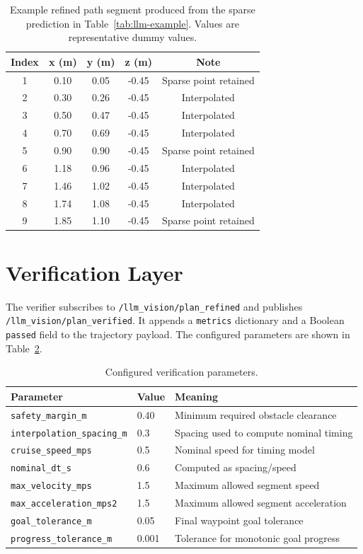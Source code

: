 \documentclass[11pt]{article}
\begin{document}
\begin{table}[H]
\centering
\caption{Example refined path segment produced from the sparse prediction in Table~\ref{tab:llm-example}. Values are representative dummy values.}
\label{tab:refined-example}
\begin{tabular}{ccccc}
\toprule
Index & x (m) & y (m) & z (m) & Note \\
\midrule
1 & 0.10 & 0.05 & -0.45 & Sparse point retained \\
2 & 0.30 & 0.26 & -0.45 & Interpolated \\
3 & 0.50 & 0.47 & -0.45 & Interpolated \\
4 & 0.70 & 0.69 & -0.45 & Interpolated \\
5 & 0.90 & 0.90 & -0.45 & Sparse point retained \\
6 & 1.18 & 0.96 & -0.45 & Interpolated \\
7 & 1.46 & 1.02 & -0.45 & Interpolated \\
8 & 1.74 & 1.08 & -0.45 & Interpolated \\
9 & 1.85 & 1.10 & -0.45 & Sparse point retained \\
\bottomrule
\end{tabular}
\end{table}

\section{Verification Layer}

The verifier subscribes to \texttt{/llm\_vision/plan\_refined} and publishes \texttt{/llm\_vision/plan\_verified}. It appends a \texttt{metrics} dictionary and a Boolean \texttt{passed} field to the trajectory payload. The configured parameters are shown in Table~\ref{tab:verification-params}.

\begin{table}[H]
\centering
\caption{Configured verification parameters.}
\label{tab:verification-params}
\begin{tabular}{lll}
\toprule
Parameter & Value & Meaning \\
\midrule
\texttt{safety\_margin\_m} & 0.40 & Minimum required obstacle clearance \\
\texttt{interpolation\_spacing\_m} & 0.3 & Spacing used to compute nominal timing \\
\texttt{cruise\_speed\_mps} & 0.5 & Nominal speed for timing model \\
\texttt{nominal\_dt\_s} & 0.6 & Computed as spacing/speed \\
\texttt{max\_velocity\_mps} & 1.5 & Maximum allowed segment speed \\
\texttt{max\_acceleration\_mps2} & 1.5 & Maximum allowed segment acceleration \\
\texttt{goal\_tolerance\_m} & 0.05 & Final waypoint goal tolerance \\
\texttt{progress\_tolerance\_m} & 0.001 & Tolerance for monotonic goal progress \\
\bottomrule
\end{tabular}
\end{table}
\end{document}
